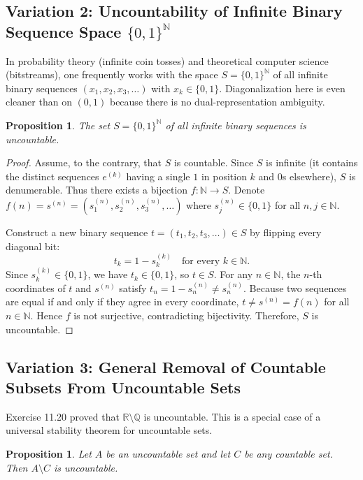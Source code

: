 \documentclass[11pt, letterpaper]{article}
\newtheorem{proposition}[theorem]{Proposition}
\theoremstyle{definition}
\theoremstyle{remark}
\begin{document}
\subsection{Variation 2: Uncountability of Infinite Binary Sequence Space $\{0, 1\}^{\mathbb{N}}$}

In probability theory (infinite coin tosses) and theoretical computer science (bitstreams), one frequently works with the space $S = \{0, 1\}^{\mathbb{N}}$ of all infinite binary sequences $(x_1, x_2, x_3, \dots)$ with $x_k \in \{0, 1\}$. Diagonalization here is even cleaner than on $(0, 1)$ because there is no dual-representation ambiguity.

\begin{proposition}
The set $S = \{0, 1\}^{\mathbb{N}}$ of all infinite binary sequences is uncountable.
\end{proposition}

\begin{proof}
Assume, to the contrary, that $S$ is countable. Since $S$ is infinite (it contains the distinct sequences $e^{(k)}$ having a single $1$ in position $k$ and $0$s elsewhere), $S$ is denumerable. Thus there exists a bijection $f : \mathbb{N} \to S$. Denote $f(n) = s^{(n)} = \left(s^{(n)}_1, s^{(n)}_2, s^{(n)}_3, \dots\right)$ where $s^{(n)}_j \in \{0, 1\}$ for all $n, j \in \mathbb{N}$.

Construct a new binary sequence $t = (t_1, t_2, t_3, \dots) \in S$ by flipping every diagonal bit:
\[
t_k = 1 - s^{(k)}_k \quad \text{for every } k \in \mathbb{N}.
\]
Since $s^{(k)}_k \in \{0, 1\}$, we have $t_k \in \{0, 1\}$, so $t \in S$. For any $n \in \mathbb{N}$, the $n$-th coordinates of $t$ and $s^{(n)}$ satisfy $t_n = 1 - s^{(n)}_n \neq s^{(n)}_n$. Because two sequences are equal if and only if they agree in every coordinate, $t \neq s^{(n)} = f(n)$ for all $n \in \mathbb{N}$. Hence $f$ is not surjective, contradicting bijectivity. Therefore, $S$ is uncountable.
\end{proof}

\subsection{Variation 3: General Removal of Countable Subsets From Uncountable Sets}

Exercise 11.20 proved that $\mathbb{R} \setminus \mathbb{Q}$ is uncountable. This is a special case of a universal stability theorem for uncountable sets.

\begin{proposition}
Let $A$ be an uncountable set and let $C$ be any countable set. Then $A \setminus C$ is uncountable.
\end{proposition}
\end{document}
